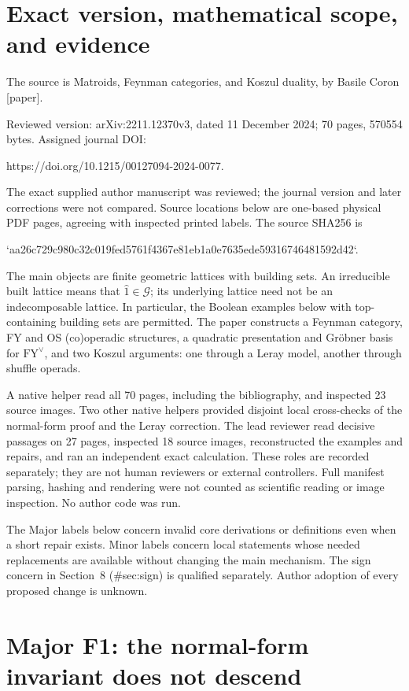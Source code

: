 \documentclass[10pt]{article}
\begin{document}
\section*{Exact version, mathematical scope, and evidence}
The source is Matroids, Feynman categories, and Koszul duality, by Basile Coron [paper].\par
Reviewed version: arXiv:2211.12370v3, dated 11 December 2024; 70 pages, 570554 bytes. Assigned journal DOI:\par
https://doi.org/10.1215/00127094-2024-0077.\par
The exact supplied author manuscript was reviewed; the journal version and later corrections were not compared. Source locations below are one-based physical PDF pages, agreeing with inspected printed labels. The source SHA256 is\par
`aa26c729c980c32c019fed5761f4367e81eb1a0e7635ede59316746481592d42`.\par
The main objects are finite geometric lattices with building sets. An irreducible built lattice means that \(\hat 1\in\mathcal G\); its underlying lattice need not be an indecomposable lattice. In particular, the Boolean examples below with top-containing building sets are permitted. The paper constructs a Feynman category, FY and OS (co)operadic structures, a quadratic presentation and Gröbner basis for \(\mathrm{FY}^\vee\), and two Koszul arguments: one through a Leray model, another through shuffle operads.\par
A native helper read all 70 pages, including the bibliography, and inspected 23 source images. Two other native helpers provided disjoint local cross-checks of the normal-form proof and the Leray correction. The lead reviewer read decisive passages on 27 pages, inspected 18 source images, reconstructed the examples and repairs, and ran an independent exact calculation. These roles are recorded separately; they are not human reviewers or external controllers. Full manifest parsing, hashing and rendering were not counted as scientific reading or image inspection. No author code was run.\par
The Major labels below concern invalid core derivations or definitions even when a short repair exists. Minor labels concern local statements whose needed replacements are available without changing the main mechanism. The sign concern in Section 8 (\#sec:sign) is qualified separately. Author adoption of every proposed change is unknown.\par
\section*{Major F1: the normal-form invariant does not descend}
\end{document}
